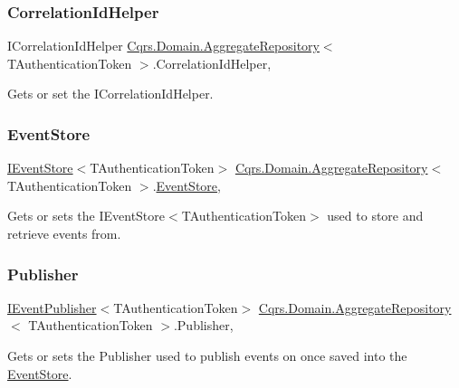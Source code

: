 \subsubsection{\texorpdfstring{Correlation\+Id\+Helper}{CorrelationIdHelper}}
{\footnotesize\ttfamily I\+Correlation\+Id\+Helper \hyperlink{classCqrs_1_1Domain_1_1AggregateRepository}{Cqrs.\+Domain.\+Aggregate\+Repository}$<$ T\+Authentication\+Token $>$.Correlation\+Id\+Helper\hspace{0.3cm}{\ttfamily [get]}, {\ttfamily [protected]}}



Gets or set the I\+Correlation\+Id\+Helper. 

\mbox{\label{classCqrs_1_1Domain_1_1AggregateRepository_a99c8546ada9058c0488727b01c626528_a99c8546ada9058c0488727b01c626528}} 
\subsubsection{\texorpdfstring{Event\+Store}{EventStore}}
{\footnotesize\ttfamily \hyperlink{interfaceCqrs_1_1Events_1_1IEventStore}{I\+Event\+Store}$<$T\+Authentication\+Token$>$ \hyperlink{classCqrs_1_1Domain_1_1AggregateRepository}{Cqrs.\+Domain.\+Aggregate\+Repository}$<$ T\+Authentication\+Token $>$.\hyperlink{classCqrs_1_1Events_1_1EventStore}{Event\+Store}\hspace{0.3cm}{\ttfamily [get]}, {\ttfamily [protected]}}



Gets or sets the I\+Event\+Store$<$\+T\+Authentication\+Token$>$ used to store and retrieve events from. 

\mbox{\label{classCqrs_1_1Domain_1_1AggregateRepository_a6388abb96d4480c6141f5d5e469a2ca0_a6388abb96d4480c6141f5d5e469a2ca0}} 
\subsubsection{\texorpdfstring{Publisher}{Publisher}}
{\footnotesize\ttfamily \hyperlink{interfaceCqrs_1_1Events_1_1IEventPublisher}{I\+Event\+Publisher}$<$T\+Authentication\+Token$>$ \hyperlink{classCqrs_1_1Domain_1_1AggregateRepository}{Cqrs.\+Domain.\+Aggregate\+Repository}$<$ T\+Authentication\+Token $>$.Publisher\hspace{0.3cm}{\ttfamily [get]}, {\ttfamily [protected]}}



Gets or sets the Publisher used to publish events on once saved into the \hyperlink{namespaceCqrs_1_1EventStore}{Event\+Store}. 

